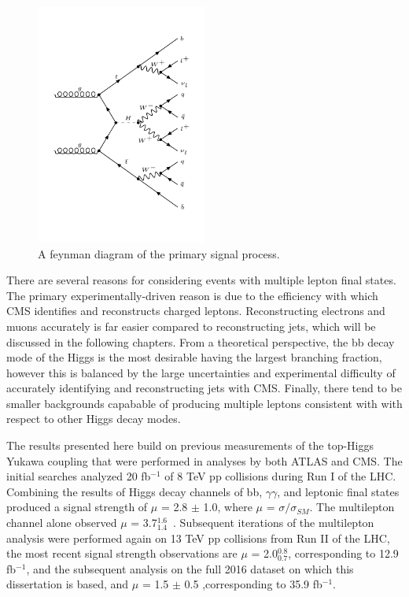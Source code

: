 \begin{figure}[hbtp]
 \begin{center}
   \includegraphics[width=0.5\textwidth]{ch1_figs/feynman_diagram_ttH_HWW_2lss.pdf}
   \caption[\tth feynman diagram]{A feynman diagram of the primary signal process.}
   \label{fig:intro_feyn}
 \end{center}
\end{figure}

There are several reasons for considering \tth events with multiple lepton final states. The primary experimentally-driven reason is due to the efficiency with which
CMS identifies and reconstructs charged leptons. Reconstructing electrons and muons accurately is far easier compared to reconstructing jets,
which will be discussed in the following chapters. 
From a theoretical perspective, the bb decay mode of the Higgs is the most desirable having the largest branching fraction, however this is balanced by the large
uncertainties and experimental difficulty of accurately identifying and reconstructing jets with CMS.
Finally, there tend to be smaller backgrounds capabable of producing multiple leptons consistent with \tth with respect to other Higgs decay modes. 


The results presented here build on previous measurements of the top-Higgs Yukawa coupling that were performed in \tth analyses by both ATLAS and CMS.
The initial searches analyzed 20 fb$^{-1}$ of 8 TeV pp collisions during Run I of the LHC. Combining the results of Higgs decay channels of bb, $\gamma\gamma$,
and leptonic final states produced a signal strength of $\mu$ = 2.8 $\pm$ 1.0, where $\mu$ = $\sigma/\sigma_{SM}$. The multilepton channel alone
observed $\mu$ = 3.7$^{1.6}_{1.4}$~\cite{jhep_tth}. Subsequent iterations of the multilepton analysis were performed again on 13 TeV pp collisions from Run II
of the LHC, the most recent signal strength observations are $\mu$ = 2.0$^{0.8}_{0.7}$, corresponding to 12.9 fb$^{-1}$, and the subsequent analysis on the full
2016 dataset on which this dissertation is based, and $\mu$ = 1.5 $\pm$ 0.5 ,corresponding to 35.9 fb$^{-1}$.


%
% 
% 
